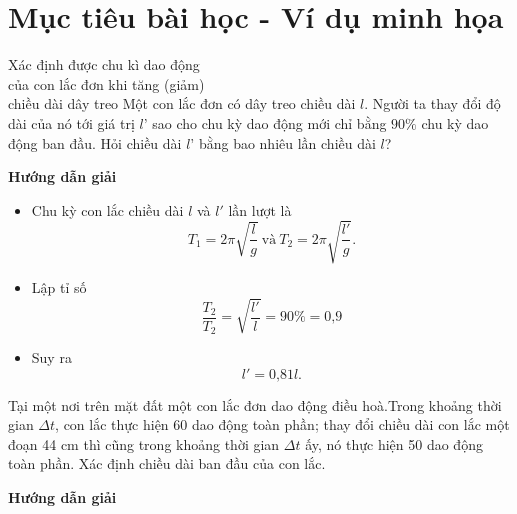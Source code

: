 \section{Mục tiêu bài học - Ví dụ minh họa}
\begin{dang}{Xác định được chu kì dao động\\ của con lắc đơn khi tăng (giảm)\\ chiều dài dây treo}
	{
		Một con lắc đơn có dây treo chiều dài $l$. Người ta thay đổi độ dài của nó tới giá trị $l’$ sao cho chu kỳ dao động mới chỉ bằng $90\%$ chu kỳ dao động ban đầu. Hỏi chiều dài $l’$ bằng bao nhiêu lần chiều dài $l$?
	}
	{
		\begin{center}
			\textbf{Hướng dẫn giải}
		\end{center}
		
		\begin{itemize}
			\item Chu kỳ con lắc chiều dài $l$ và $l'$ lần lượt là
			\begin{equation*}
				T_1 =2\pi \sqrt{\dfrac{l}{g}}\ \text{và}\ T_2=2\pi \sqrt{\dfrac{l'}{g}}.
			\end{equation*}
			\item Lập tỉ số 
			\begin{equation*}
				\dfrac{T_2}{T_2} =\sqrt {\dfrac{l'}{l}} = 90\% =\text{0,9}
			\end{equation*}
			\item Suy ra 
			\begin{equation*}
				l'=\text {0,81} l.
			\end{equation*}
		\end{itemize}
	}
	{
		Tại một nơi trên mặt đất một  con lắc đơn dao động điều hoà.Trong khoảng thời gian $\Delta t$, con lắc thực hiện 60 dao động toàn phần; thay đổi chiều dài con lắc một đoạn 44 cm thì cũng trong khoảng thời gian $\Delta t$ ấy, nó thực hiện 50 dao động toàn phần. Xác định chiều dài ban đầu của con lắc.
	}
	{\begin{center}
			\textbf{Hướng dẫn giải}
		\end{center}
		
}
\end{dang}
